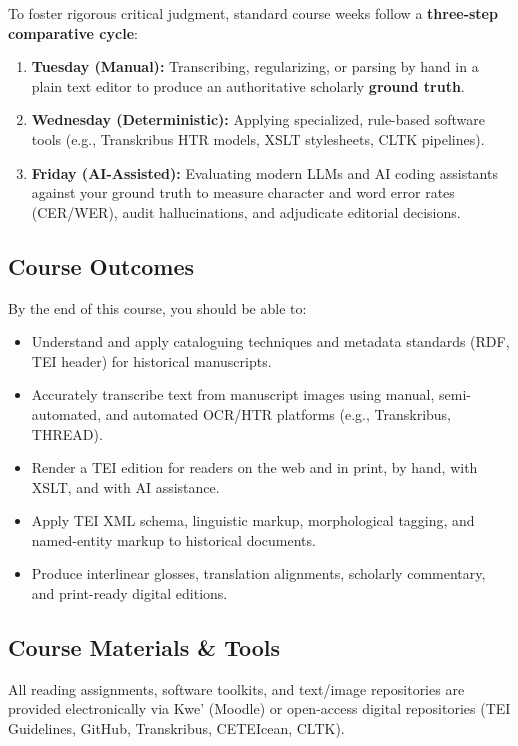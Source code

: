 \documentclass[12pt,oncampus]{article}
\begin{document}
To foster rigorous critical judgment, standard course weeks follow a \textbf{three-step comparative cycle}:
\begin{enumerate}[leftmargin=*,noitemsep,topsep=2pt]
  \item \textbf{Tuesday (Manual):} Transcribing, regularizing, or parsing by hand in a plain text editor to produce an authoritative scholarly \textbf{ground truth}.
  \item \textbf{Wednesday (Deterministic):} Applying specialized, rule-based software tools (e.g., Transkribus HTR models, XSLT stylesheets, CLTK pipelines).
  \item \textbf{Friday (AI-Assisted):} Evaluating modern LLMs and AI coding assistants against your ground truth to measure character and word error rates (CER/WER), audit hallucinations, and adjudicate editorial decisions.
\end{enumerate}

\subsection*{Course Outcomes}

By the end of this course, you should be able to:
\begin{itemize}
  \item Understand and apply cataloguing techniques and metadata standards (RDF, TEI header) for historical manuscripts.
  \item Accurately transcribe text from manuscript images using manual, semi-automated, and automated OCR/HTR platforms (e.g., Transkribus, THREAD).
  \item Render a TEI edition for readers on the web and in print, by hand, with XSLT, and with AI assistance.
  \item Apply TEI XML schema, linguistic markup, morphological tagging, and named-entity markup to historical documents.
  \item Produce interlinear glosses, translation alignments, scholarly commentary, and print-ready digital editions.
\end{itemize}

\subsection*{Course Materials \& Tools}

All reading assignments, software toolkits, and text/image repositories are provided electronically via Kwe' (Moodle) or open-access digital repositories (TEI Guidelines, GitHub, Transkribus, CETEIcean, CLTK).
\end{document}
